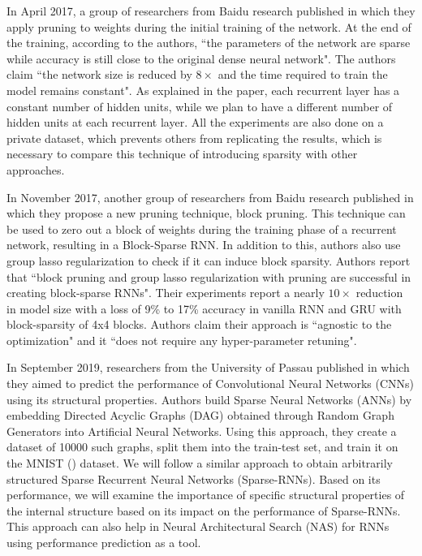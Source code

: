 In April 2017, a group of researchers from Baidu research published \cite{sparse-rnn} in which they apply pruning to weights during the initial training of the network. At the end of the training, according to the authors, ``the parameters of the network are sparse while accuracy is still close to the original dense neural network". The authors claim ``the network size is reduced by $8\times$ and the time required to train the model remains constant". As explained in the paper, each recurrent layer has a constant number of hidden units, while we plan to have a different number of hidden units at each recurrent layer. All the experiments are also done on a private dataset, which prevents others from replicating the results, which is necessary to compare this technique of introducing sparsity with other approaches.

In November 2017, another group of researchers from Baidu research published \cite{narang-sparse} in which they propose a new pruning technique, block pruning. This technique can be used to zero out a block of weights during the training phase of a recurrent network, resulting in a Block-Sparse RNN. In addition to this, authors also use group lasso regularization to check if it can induce block sparsity. Authors report that ``block pruning and group lasso regularization with pruning are successful in creating block-sparse RNNs".  Their experiments report a nearly $10\times$ reduction in model size with a loss of 9\% to 17\% accuracy in vanilla RNN and GRU with block-sparsity of 4x4 blocks. Authors claim their approach is ``agnostic to the optimization" and it ``does not require any hyper-parameter retuning".

In September 2019, researchers from the University of Passau published \cite{julian} in which they aimed to predict the performance of Convolutional Neural Networks (CNNs) using its structural properties. Authors build Sparse Neural Networks (ANNs) by embedding Directed Acyclic Graphs (DAG) obtained through Random Graph Generators into Artificial Neural Networks. Using this approach, they create a dataset of 10000 such graphs, split them into the train-test set, and train it on the MNIST (\cite{mnist}) dataset. We will follow a similar approach to obtain arbitrarily structured Sparse Recurrent Neural Networks (Sparse-RNNs). Based on its performance, we will examine the importance of specific structural properties of the internal structure based on its impact on the performance of Sparse-RNNs.  This approach can also help in Neural Architectural Search (NAS) for RNNs using performance prediction as a tool.

